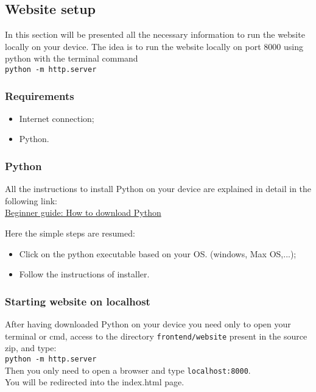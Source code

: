 \newpage 
\subsection{Website setup}
In this section will be presented all the necessary information to run the website locally on your device.
The idea is to run the website locally  on port 8000 using python with the terminal command \\
\texttt{python -m http.server}

\subsubsection{Requirements}
\begin{itemize}
    \item Internet connection;
    \item Python.
\end{itemize}

\subsubsection{Python}
All the instructions to install Python on your device are explained in detail in the following link: \\
\href{https://wiki.python.org/moin/BeginnersGuide/Download}{Beginner guide: How to download Python}

Here the simple steps are resumed:
\begin{itemize}
    \item Click on the python executable based on your OS. (windows, Max OS,...);
    \item Follow the instructions of installer.
\end{itemize}

\subsubsection{Starting website on localhost}
After having downloaded Python on your device you need only to open your terminal or cmd, access to the directory \texttt{frontend/website} present in the source zip, and type:\\
\texttt{python -m http.server}\\

\noindent Then you only need to open a browser and type \texttt{localhost:8000}. \\
You will be redirected into the index.html page.